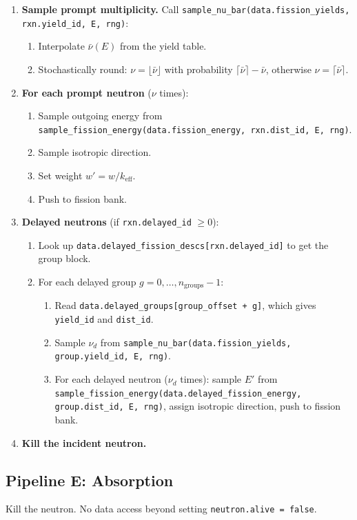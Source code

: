 \documentclass[11pt,a4paper]{article}
\begin{document}
\begin{enumerate}[leftmargin=1.4em]
  \item \textbf{Sample prompt multiplicity.} Call \texttt{sample\_nu\_bar(data.fission\_yields, rxn.yield\_id, E, rng)}:
  \begin{enumerate}
    \item Interpolate $\bar\nu(E)$ from the yield table.
    \item Stochastically round: $\nu = \lfloor\bar\nu\rfloor$ with probability $\lceil\bar\nu\rceil - \bar\nu$, otherwise $\nu = \lceil\bar\nu\rceil$.
  \end{enumerate}
  \item \textbf{For each prompt neutron} ($\nu$ times):
  \begin{enumerate}
    \item Sample outgoing energy from \texttt{sample\_fission\_energy(data.fission\_energy, rxn.dist\_id, E, rng)}.
    \item Sample isotropic direction.
    \item Set weight $w' = w / k_\text{eff}$.
    \item Push to fission bank.
  \end{enumerate}
  \item \textbf{Delayed neutrons} (if \texttt{rxn.delayed\_id} $\ge 0$):
  \begin{enumerate}
    \item Look up \texttt{data.delayed\_fission\_descs[rxn.delayed\_id]} to get the group block.
    \item For each delayed group $g = 0, \ldots, n_\text{groups}-1$:
    \begin{enumerate}
      \item Read \texttt{data.delayed\_groups[group\_offset + g]}, which gives \texttt{yield\_id} and \texttt{dist\_id}.
      \item Sample $\nu_d$ from \texttt{sample\_nu\_bar(data.fission\_yields, group.yield\_id, E, rng)}.
      \item For each delayed neutron ($\nu_d$ times): sample $E'$ from \texttt{sample\_fission\_energy(data.delayed\_fission\_energy, group.dist\_id, E, rng)}, assign isotropic direction, push to fission bank.
    \end{enumerate}
  \end{enumerate}
  \item \textbf{Kill the incident neutron.}
\end{enumerate}

\subsection{Pipeline E: Absorption}
Kill the neutron. No data access beyond setting \texttt{neutron.alive = false}.
\end{document}
